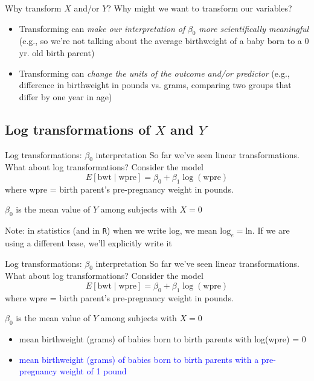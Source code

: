 \documentclass[10pt,t]{beamer}
\begin{document}
\begin{frame}{Why transform $X$ and/or $Y$?}
Why might we want to transform our variables?

\begin{itemize}
	\item Transforming can \textit{make our interpretation of} $\beta_0$ \textit{more scientifically meaningful} (e.g., so we're not talking about the average birthweight of a baby born to a 0 yr. old birth parent)
	\item Transforming can \textit{change the units of the outcome and/or predictor} (e.g., difference in birthweight in pounds vs. grams, comparing two groups that differ by one year in age)
\end{itemize}
\end{frame}

\subsection{Log transformations of $X$ and $Y$}

\begin{frame}{Log transformations: $\beta_0$ interpretation}
So far we've seen linear transformations. What about log transformations? Consider the model
$$
E[\text{bwt} \mid \text{wpre}] = \beta_0 + \beta_1 \log(\text{wpre})
$$
where wpre = birth parent's pre-pregnancy weight in pounds.

\vspace{0.3cm}

$\beta_0$ is the mean value of $Y$ among subjects with $X = 0$

\vspace{0.3cm}

\tiny *Note: in statistics (and in \texttt{R}) when we write log, we mean $\text{log}_e = \text{ln}$. If we are using a different base, we'll explicitly write it

\end{frame}

\begin{frame}{Log transformations: $\beta_0$ interpretation}
So far we've seen linear transformations. What about log transformations? Consider the model
$$
E[\text{bwt} \mid \text{wpre}] = \beta_0 + \beta_1 \log(\text{wpre})
$$
where wpre = birth parent's pre-pregnancy weight in pounds.

\vspace{0.3cm}

$\beta_0$ is the mean value of $Y$ among subjects with $X = 0$

\begin{itemize}
	\item[] mean birthweight (grams) of babies born to birth parents with log(wpre) = 0\pause
	\item[] \textcolor{blue}{mean birthweight (grams) of babies born to birth parents with a pre-pregnancy weight of 1 pound}
\end{itemize}

\end{frame}
\end{document}
